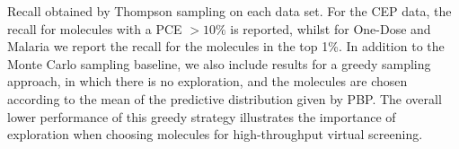 Recall obtained by Thompson sampling on each data set. For the CEP data, the recall for molecules with a PCE $>10\%$ is reported, whilst for One-Dose and Malaria we report the recall for the molecules in the top 1\%. In addition to the Monte Carlo sampling baseline, we also include results for a greedy sampling approach, in which there is no exploration, and the molecules are chosen according to the mean of the predictive distribution given by PBP. The overall lower performance of this greedy strategy illustrates the importance of exploration when choosing molecules for high-throughput virtual screening.\label{fig:thompson_1pc}
